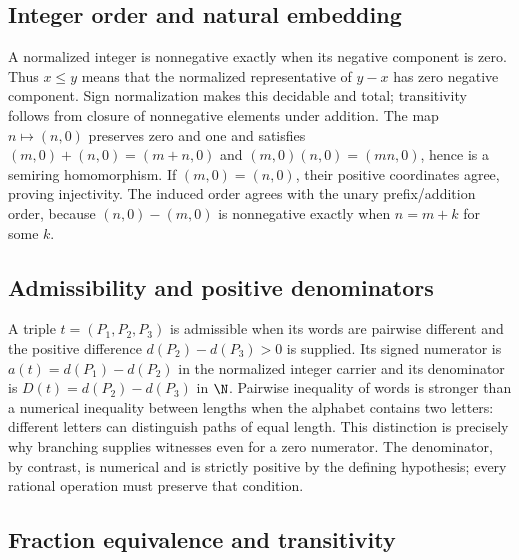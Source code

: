 \subsection{Integer order and natural embedding}\label{supp:5-4}
\par{}\par\smallskip

A normalized integer is nonnegative exactly when its negative component is zero. Thus $x\le y$ means that the normalized representative of $y-x$ has zero negative component. Sign normalization makes this decidable and total; transitivity follows from closure of nonnegative elements under addition. The map $n\mapsto(n,0)$ preserves zero and one and satisfies $(m,0)+(n,0)=(m+n,0)$ and $(m,0)(n,0)=(mn,0)$, hence is a semiring homomorphism. If $(m,0)=(n,0)$, their positive coordinates agree, proving injectivity. The induced order agrees with the unary prefix/addition order, because $(n,0)-(m,0)$ is nonnegative exactly when $n=m+k$ for some $k$.

\subsection{Admissibility and positive denominators}\label{supp:6-1}
\par{}\par\smallskip

A triple $t=(P_1,P_2,P_3)$ is admissible when its words are pairwise different and the positive difference $d(P_2)-d(P_3)>0$ is supplied. Its signed numerator is $a(t)=d(P_1)-d(P_2)$ in the normalized integer carrier and its denominator is $D(t)=d(P_2)-d(P_3)$ in $\N$. Pairwise inequality of words is stronger than a numerical inequality between lengths when the alphabet contains two letters: different letters can distinguish paths of equal length. This distinction is precisely why branching supplies witnesses even for a zero numerator. The denominator, by contrast, is numerical and is strictly positive by the defining hypothesis; every rational operation must preserve that condition.

\subsection{Fraction equivalence and transitivity}\label{supp:6-2}
\par{}\par\smallskip

